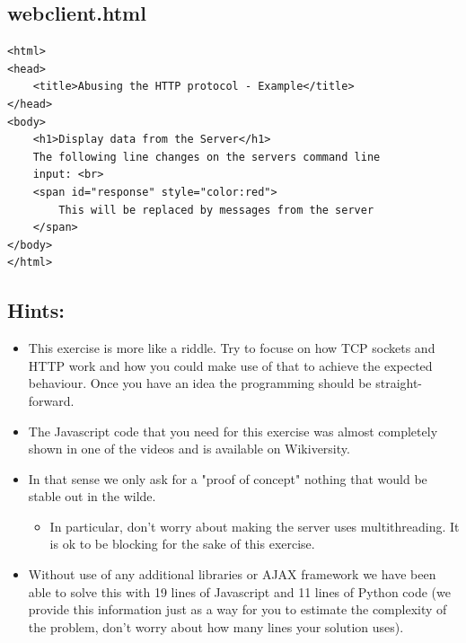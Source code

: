 \documentclass{WeSTassignment}
\begin{document}
\subsection{webclient.html}
\begin{lstlisting}
<html>
<head>
	<title>Abusing the HTTP protocol - Example</title>
</head>
<body>
	<h1>Display data from the Server</h1>
	The following line changes on the servers command line
	input: <br>
	<span id="response" style="color:red">
		This will be replaced by messages from the server
	</span>
</body>
</html>
\end{lstlisting}

\subsection{Hints:}
\begin{itemize}
\item This exercise is more like a riddle. Try to focuse on how TCP sockets and HTTP work and how you could make use of that to achieve the expected behaviour. Once you have an idea the programming should be straight-forward. 
\item The Javascript code that you need for this exercise was almost completely shown in one of the videos and is available on Wikiversity.
\item In that sense we only ask for a "proof of concept" nothing that would be stable out in the wilde.
  \begin{itemize}
  	\item In particular, don't worry about making the server uses multithreading. It is ok to be blocking for the sake of this exercise.
  \end{itemize}
\item Without use of any additional libraries or AJAX framework we have been able to solve this with 19 lines of Javascript and 11 lines of Python code (we provide this information just as a way for you to estimate the complexity of the problem, don't worry about how many lines your solution uses).
\end{itemize}
\end{document}
